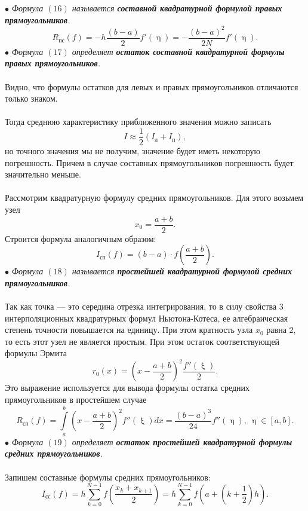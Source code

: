 \documentclass[a4paper, 12pt]{report}
\numberwithin{equation}{section}
\renewcommand{\eta}{\upeta}
\renewcommand{\xi}{\upxi}
\begin{document}
	 $\bullet$ \textit{Формула $(16)$ называется \textbf{составной квадратурной формулой правых прямоугольников}.}
	 \begin{equation}
	 	R_\text{пс}(f) = -h\dfrac{(b-a)}{2}f'(\eta) = -\dfrac{(b-a)^2}{2N}f'(\eta).
	 \end{equation}
	 $\bullet$ \textit{Формула $(17)$ определяет \textbf{остаток составной квадратурной формулы правых прямоугольников}.}\\\\
	 Видно, что формулы остатков для левых и правых прямоугольников отличаются только знаком.\\\\
	 Тогда среднюю характеристику приближенного значения можно записать $$I\approx \dfrac12(I_\text{л} + I_\text{п}),$$
	 но точного значения мы не получим, значение будет иметь некоторую погрешность. Причем в случае составных прямоугольников погрешность будет значительно меньше.\\\\
	 Рассмотрим квадратурную формулу средних прямоугольников. Для этого возьмем узел $$x_0 = \dfrac{a+b}{2}.$$
	 Строится формула аналогичным образом: 
	 \begin{equation}
	 	I_\text{сп}(f) = (b-a)\cdot f\left(\dfrac{a+b}{2}\right).
	 \end{equation}
	 $\bullet$ \textit{Формула $(18)$ называется \textbf{простейшей квадратурной формулой средних прямоугольников}.}\\\\
	 Так как точка --- это середина отрезка интегрирования, то в силу свойства 3 интерполяционных квадратурных формул Ньютона-Котеса, ее алгебраическая степень точности повышается на единицу. При этом кратность узла $x_0$ равна 2, то есть этот узел не является простым. При этом остаток соответствующей формулы Эрмита $$r_0(x) = \left(x-\dfrac{a+b}{2}\right)^2 \dfrac{f''(\xi)}{2}.$$
	 Это выражение используется для вывода формулы остатка средних прямоугольников в простейшем случае \begin{equation}
	 	R_\text{сп}(f)= \int\limits_a^b \left(x-\dfrac{a+b}{2}\right)^2f''(\xi)dx = \dfrac{(b-a)^3}{24}f''(\eta) ,\ \eta \in [a,b].
	 \end{equation}
	 $\bullet$ \textit{Формула $(19)$ определяет \textbf{остаток простейшей квадратурной формулы средних прямоугольников}.}\\\\
	 Запишем составные формулы средних прямоугольников:
	 \begin{equation}
	 	I_\text{сс}(f) = h\sum_{k=0}^{N-1}f\left(\dfrac{x_k+x_{k+1}}{2}\right) = h\sum_{k=0}^{N-1}f\left(a+\left(k+\dfrac12\right)h\right).
	 \end{equation}
\end{document}
